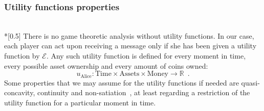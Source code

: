\subsubsection{Utility functions properties} \ \\*[0.5\baselineskip]
  There is no game theoretic analysis without utility functions. In our case, each player
  can act upon receiving a message only if she has been given a utility function by
  $\mathcal{E}$. Any such utility function is defined for every moment in time, every
  possible asset ownership and every amount of coins owned:
  \begin{equation*}
    u_{\mathrm{Alice}} : \mathrm{Time} \times \mathrm{Assets} \times \mathrm{Money}
    \rightarrow \mathbb{R} \enspace.
  \end{equation*}
  Some properties that we may assume for the utility functions if needed are
  quasi-concavity, continuity and non-satiation~\cite{marketequilibrium}, at least
  regarding a restriction of the utility function for a particular moment in time.
